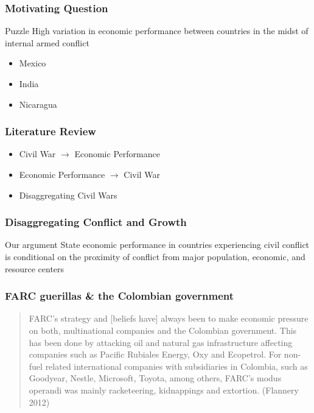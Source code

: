 \begin{frame}
\titlepage
\end{frame}

\begin{frame}
\frametitle{Motivating Question}

\begin{block}{Puzzle}
High variation in economic performance between countries in the midst of internal armed conflict
\begin{itemize}
\item Mexico
\item India
\item Nicaragua
\end{itemize}
\end{block}

\end{frame}

\begin{frame}
\frametitle{Literature Review}

\begin{itemize}
	\item Civil War $\rightarrow$ Economic Performance
	\item Economic Performance $\rightarrow$ Civil War
	\item Disaggregating Civil Wars
\end{itemize}

\end{frame}

\begin{frame}
\frametitle{Disaggregating Conflict and Growth}

\begin{block}{Our argument}
State economic performance in countries experiencing civil conflict is conditional on the proximity of conflict from major population, economic, and resource centers
\end{block}

\end{frame}

\begin{frame}
\frametitle{FARC guerillas \& the Colombian government}

\begin{quote}FARC's strategy and [beliefs have] always been to make economic pressure on both, multinational companies and the Colombian government. This has been done by attacking oil and natural gas infrastructure affecting companies such as Pacific Rubiales Energy, Oxy and Ecopetrol. For non-fuel related international companies with subsidiaries in Colombia, such as Goodyear, Nestle, Microsoft, Toyota, among others, FARC’s modus operandi was mainly racketeering, kidnappings and extortion. (Flannery 2012)\end{quote}

\end{frame}

